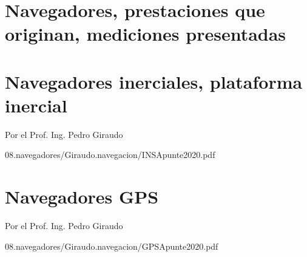 \section{Navegadores, prestaciones que originan, mediciones presentadas}
\label{sec:U08.01.navegadores.prestaciones}


\section{Navegadores inerciales, plataforma inercial}
\label{sec:U08.navegadores.inerciales}

\begin{flushright}
  Por el Prof. Ing. Pedro Giraudo
\end{flushright}

  
{08.navegadores/Giraudo.navegacion/INSApunte2020.pdf}



\section{Navegadores GPS}
\label{sec:U08.03.GPS}

\begin{flushright}
  Por el Prof. Ing. Pedro Giraudo
\end{flushright}

  
{08.navegadores/Giraudo.navegacion/GPSApunte2020.pdf}